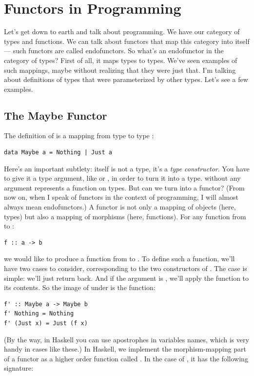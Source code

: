 \section{Functors in Programming}

Let's get down to earth and talk about programming. We have our category
of types and functions. We can talk about functors that map this
category into itself --- such functors are called endofunctors. So
what's an endofunctor in the category of types? First of all, it maps
types to types. We've seen examples of such mappings, maybe without
realizing that they were just that. I'm talking about definitions of
types that were parameterized by other types. Let's see a few examples.

\subsection{The Maybe Functor}

The definition of  is a mapping from type  to
type :

\begin{Verbatim}
data Maybe a = Nothing | Just a
\end{Verbatim}
Here's an important subtlety:  itself is not a type, it's
a \emph{type constructor}. You have to give it a type argument, like
 or , in order to turn it into a type.
 without any argument represents a function on types. But
can we turn  into a functor? (From now on, when I speak of
functors in the context of programming, I will almost always mean
endofunctors.) A functor is not only a mapping of objects (here, types)
but also a mapping of morphisms (here, functions). For any function from
 to :

\begin{Verbatim}
f :: a -> b
\end{Verbatim}
we would like to produce a function from  to
. To define such a function, we'll have two cases to
consider, corresponding to the two constructors of . The
 case is simple: we'll just return 
back. And if the argument is , we'll apply the function
 to its contents. So the image of  under
 is the function:

\begin{Verbatim}
f' :: Maybe a -> Maybe b
f' Nothing = Nothing
f' (Just x) = Just (f x)
\end{Verbatim}
(By the way, in Haskell you can use apostrophes in variables names,
which is very handy in cases like these.) In Haskell, we implement the
morphism-mapping part of a functor as a higher order function called
. In the case of , it has the following
signature:

